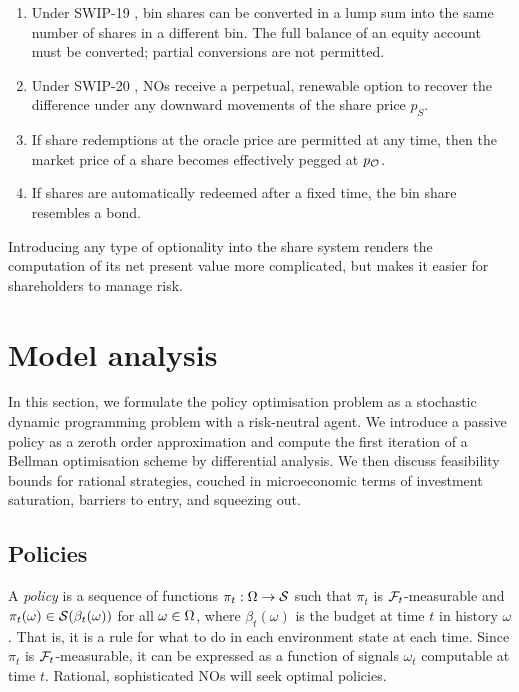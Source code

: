 \begin{enumerate}

  \item
    Under SWIP-19 \cite{swip-19}, bin shares can be converted in a lump sum into the same number of shares in a different bin.
    The full balance of an equity account must be converted; partial conversions are not permitted.

  \item
    Under SWIP-20 \cite{swip-20}, NOs receive a perpetual, renewable option to recover the difference under any downward movements of the share price $p_S$.

  \item 
    If share redemptions at the oracle price are permitted at any time, then the market price of a share becomes effectively pegged at $p_{\mathcal{O}}$.

  \item
    If shares are automatically redeemed after a fixed time, the bin share resembles a bond.
    
\end{enumerate}
%
Introducing any type of optionality into the share system renders the computation of its net present value more complicated, but makes it easier for shareholders to manage risk.


\section{Model analysis}
\label{section:analysis}

In this section, we formulate the policy optimisation problem as a stochastic dynamic programming problem with a risk-neutral agent.
%
We introduce a passive policy as a zeroth order approximation and compute the first iteration of a Bellman optimisation scheme by differential analysis.
%
We then discuss feasibility bounds for rational strategies, couched in microeconomic terms of investment saturation, barriers to entry, and squeezing out.



\subsection{Policies}
\label{section:policies}

A \emph{policy} is a sequence of functions $\pi_t:\Omega\rightarrow\mathcal{S}$ such that $\pi_t$ is $\mathcal{F}_t$-measurable and $\pi_t(\omega)\in\mathcal{S}(\beta_t(\omega))$ for all $\omega\in\Omega$, where $\beta_t(\omega)$ is the budget at time $t$ in history $\omega$.
%
That is, it is a rule for what to do in each environment state at each time.
%
Since $\pi_t$ is $\mathcal{F}_t$-measurable, it can be expressed as a function of signals $\omega_t$ computable at time $t$.
%
Rational, sophisticated NOs will seek optimal policies.


